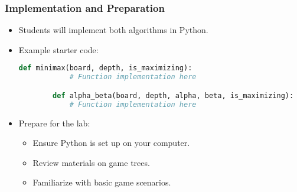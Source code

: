 \documentclass[aspectratio=169]{beamer}
\begin{document}
\begin{frame}[fragile]
    \frametitle{Implementation and Preparation}
    \begin{itemize}
        \item Students will implement both algorithms in Python.
        \item Example starter code:
        \begin{lstlisting}[language=Python]
        def minimax(board, depth, is_maximizing):
            # Function implementation here

        def alpha_beta(board, depth, alpha, beta, is_maximizing):
            # Function implementation here
        \end{lstlisting}
        \item Prepare for the lab:
        \begin{itemize}
            \item Ensure Python is set up on your computer.
            \item Review materials on game trees.
            \item Familiarize with basic game scenarios.
        \end{itemize}
    \end{itemize}
\end{frame}
\end{document}
